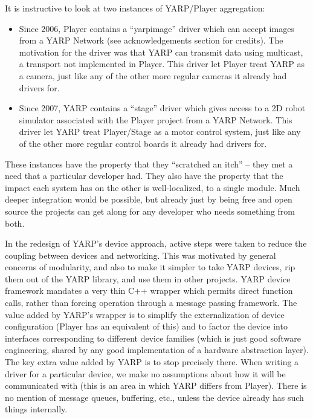 It is instructive to look at two instances of YARP/Player aggregation:

\begin{itemize}

\item
Since 2006, Player contains a ``yarpimage'' driver which can accept
images from a YARP Network (see acknowledgements section for credits).
The motivation for the driver was that YARP can transmit
data using multicast, a transport not implemented in Player. 
This driver let Player treat YARP as a camera, just like
any of the other more regular cameras it already had drivers 
for.

\item
Since 2007, YARP contains a ``stage'' driver which gives access to 
a 2D robot simulator associated with the Player project 
from a YARP Network.  This driver let YARP treat Player/Stage as
a motor control system, just like any of the other more regular 
control boards it already had drivers for.

\end{itemize}

These instances have the property that they ``scratched an itch'' --
they met a need that a particular developer had.
They also have the property that the impact each system
has on the other is well-localized, to a single module.
Much deeper integration would be possible, but already
just by being free and open source the projects can get along
for any developer who needs something from both.

In the redesign of YARP's device approach, active steps were
taken to reduce the coupling between devices and networking.
%
This was motivated by general concerns of modularity, and also
to make it simpler to take YARP devices, rip them out
of the YARP library, and use them in other projects.
%
%
%
YARP device framework mandates a very thin C++ wrapper which permits direct function
calls, rather than forcing operation through a message passing
framework.  The value added by YARP's wrapper is to simplify the
externalization of device configuration (Player has an equivalent of
this) and to factor the device into interfaces corresponding to
different device families (which is just good software engineering,
shared by any good implementation of a hardware abstraction layer).
%
The key extra value added by YARP is to stop precisely there.
%
When writing a driver for a particular device, we make no assumptions
about how it will be communicated with (this is an area in which YARP
differs from Player).  There is no mention of message queues, 
buffering, etc., unless the device already has such things internally.

